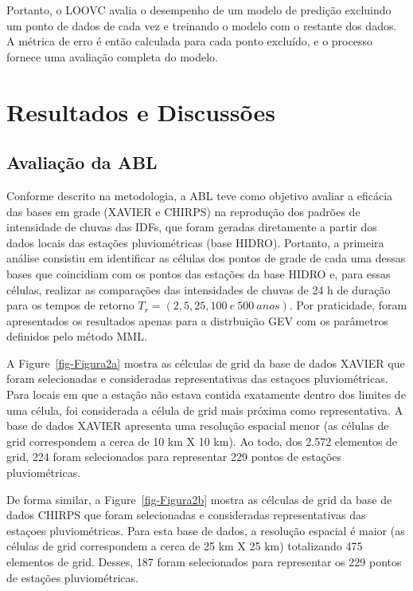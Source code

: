 \documentclass[
]{agujournal2019}
\begin{document}
Portanto, o LOOVC avalia o desempenho de um modelo de predição excluindo
um ponto de dados de cada vez e treinando o modelo com o restante dos
dados. A métrica de erro é então calculada para cada ponto excluído, e o
processo fornece uma avaliação completa do modelo.

\section{Resultados e Discussões}\label{resultados-e-discussuxf5es}

\justifying

\subsection{Avaliação da ABL}\label{avaliauxe7uxe3o-da-abl}

Conforme descrito na metodologia, a ABL teve como objetivo avaliar a
eficácia das bases em grade (XAVIER e CHIRPS) na reprodução dos padrões
de intensidade de chuvas das IDFs, que foram geradas diretamente a
partir dos dados locais das estações pluviométricas (base HIDRO).
Portanto, a primeira análise consistiu em identificar as células dos
pontos de grade de cada uma dessas bases que coincidiam com os pontos
das estações da base HIDRO e, para essas células, realizar as
comparações das intensidades de chuvas de 24 h de duração para os tempos
de retorno \(T_r=(2, 5, 25, 100\ e \ 500 \ anos)\). Por praticidade,
foram apresentados os resultados apenas para a distrbuição GEV com os
parâmetros definidos pelo método MML.

A Figure~\ref{fig-Figura2a} mostra as célculas de grid da base de dados
XAVIER que foram selecionadas e consideradas representativas das
estaçoes pluviométricas. Para locais em que a estação não estava contida
exatamente dentro dos limites de uma célula, foi considerada a célula de
grid mais próxima como representativa. A base de dados XAVIER apresenta
uma resolução espacial menor (as células de grid correspondem a cerca de
10 km X 10 km). Ao todo, dos 2.572 elementos de grid, 224 foram
selecionados para representar 229 pontos de estações pluviométricas.

De forma similar, a Figure~\ref{fig-Figura2b} mostra as célculas de grid
da base de dados CHIRPS que foram selecionadas e consideradas
representativas das estaçoes pluviométricas. Para esta base de dados, a
resolução espacial é maior (as células de grid correspondem a cerca de
25 km X 25 km) totalizando 475 elementos de grid. Desses, 187 foram
selecionados para representar os 229 pontos de estações pluviométricas.
\end{document}
